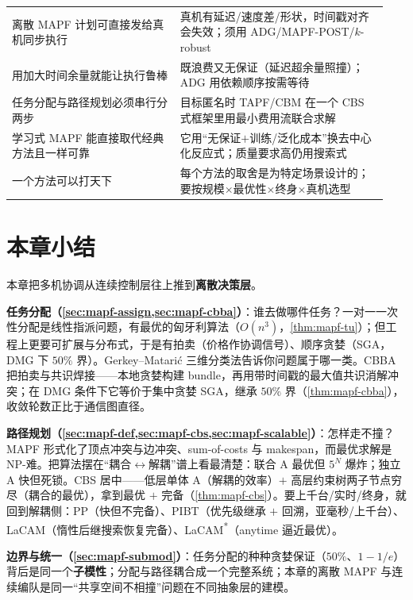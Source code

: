 \begin{table}[H]
\begin{tabular}{p{0.42\linewidth}p{0.52\linewidth}}
离散 MAPF 计划可直接发给真机同步执行 & 真机有延迟/速度差/形状，时间戳对齐会失效；须用 ADG/MAPF-POST/$k$-robust \\
用加大时间余量就能让执行鲁棒 & 既浪费又无保证（延迟超余量照撞）；ADG 用依赖顺序按需等待 \\
任务分配与路径规划必须串行分两步 & 目标匿名时 TAPF/CBM 在一个 CBS 式框架里用最小费用流联合求解 \\
学习式 MAPF 能直接取代经典方法且一样可靠 & 它用“无保证$+$训练/泛化成本”换去中心化反应式；质量要求高仍用搜索式 \\
一个方法可以打天下 & 每个方法的取舍是为特定场景设计的；要按规模$\times$最优性$\times$终身$\times$真机选型 \\
\bottomrule
\end{tabular}
\end{table}

\section{本章小结}
\label{sec:mapf-summary}

本章把多机协调从连续控制层往上推到\textbf{离散决策层}。

\textbf{任务分配（\cref{sec:mapf-assign,sec:mapf-cbba}）}：谁去做哪件任务？一对一一次性分配是线性指派问题，有最优的匈牙利算法（$O(n^3)$，\cref{thm:mapf-tu}）；但工程上更要可扩展与分布式，于是有拍卖（价格作协调信号）、顺序贪婪（SGA，DMG 下 $50\%$ 界）。Gerkey--Matari\'c 三维分类法告诉你问题属于哪一类。CBBA 把拍卖与共识焊接——本地贪婪构建 bundle，再用带时间戳的最大值共识消解冲突；在 DMG 条件下它等价于集中贪婪 SGA，继承 $50\%$ 界（\cref{thm:mapf-cbba}），收敛轮数正比于通信图直径。

\textbf{路径规划（\cref{sec:mapf-def,sec:mapf-cbs,sec:mapf-scalable}）}：怎样走不撞？MAPF 形式化了顶点冲突与边冲突、sum-of-costs 与 makespan，而最优求解是 NP-难。把算法摆在“耦合$\leftrightarrow$解耦”谱上看最清楚：联合 A\* 最优但 $5^N$ 爆炸；独立 A\* 快但死锁。CBS 居中——低层单体 A\*（解耦的效率）$+$ 高层约束树两子节点穷尽（耦合的最优），拿到最优 $+$ 完备（\cref{thm:mapf-cbs}）。要上千台/实时/终身，就回到解耦侧：PP（快但不完备）、PIBT（优先级继承 $+$ 回溯，亚毫秒/上千台）、LaCAM（惰性后继搜索恢复完备）、LaCAM\textsuperscript{*}（anytime 逼近最优）。

\textbf{边界与统一（\cref{sec:mapf-submod}）}：任务分配的种种贪婪保证（$50\%$、$1-1/e$）背后是同一个\textbf{子模性}；分配与路径耦合成一个完整系统；本章的离散 MAPF 与连续编队是同一“共享空间不相撞”问题在不同抽象层的建模。

